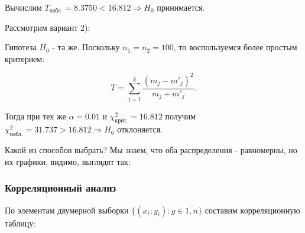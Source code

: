 \documentclass{report}
\begin{document}
Вычислим $T_\text{набл.} = 8.3750 < 16.812 \Rightarrow H_0$ принимается.

Рассмотрим вариант 2):

Гипотеза $H_0$ - та же. Поскольку $n_1 = n_2 = 100$, то воспользуемся более простым критерием:

\begin{equation}
T = \sum \limits^{k}_{j = 1} \frac{\left(m_j - m'_j\right)^2}{m_j + m'_j}.
\end{equation}

Тогда при тех же $\alpha = 0.01$ и $\chi^2_\text{крит.} = 16.812$ получим $\chi^2_\text{набл.} = 31.737 > 16.812 \Rightarrow H_0$ отклоняется.

Какой из способов выбрать? Мы знаем, что оба распределения - равномерны, но их графики, видимо, выглядят так:

\begin{figure}[h] \label{fig:3}
\centering
{}
\end{figure}

\newpage

\subsubsection*{Корреляционный анализ}

По элементам двумерной выборки $\{ (x_i;y_i) : y \in \bar {1,n} \}$ составим корреляционную таблицу:
\end{document}
